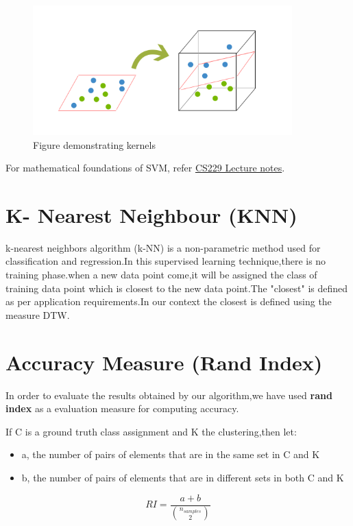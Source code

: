 \begin{figure} [!htbp]
\centering
\includegraphics[width=100mm]{Pictures/svm3.png}
\caption{Figure demonstrating kernels}
\end{figure}

For mathematical foundations of SVM, refer \href{http://cs229.stanford.edu/notes/cs229-notes3.pdf}{CS229 Lecture notes}. 

\section{K- Nearest Neighbour (KNN)}

k-nearest neighbors algorithm (k-NN) is a non-parametric method used for classification and regression.In this supervised learning technique,there is no training phase.when a new data point come,it will be assigned the class of training data point which is closest to the new data point.The "closest" is defined as per application requirements.In our context the closest is defined using the measure DTW.




\section{Accuracy Measure (Rand Index)}
In order to evaluate the results obtained by our algorithm,we have used \textbf{rand index} as a evaluation measure for computing accuracy.

If C is a ground truth class assignment and K the clustering,then let:
\begin{itemize}
    \item a, the number of pairs of elements that are in the same set in C and K
    \item b, the number of pairs of elements that are in different sets in both  C and K
\end{itemize}
\[ RI = \frac{a + b}{\binom{n_{samples}}{2}}\]
















